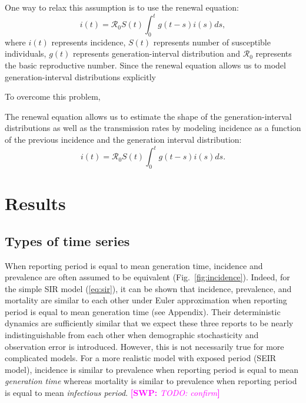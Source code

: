 \documentclass{article}
\newcommand{\eref}[1]{(\ref{eq:#1})}
\newcommand{\fref}[1]{Fig.~\ref{fig:#1}}
\newcommand{\comment}[3]{\textcolor{#1}{\textbf{[#2: }\textsl{#3}\textbf{]}}}
\newcommand{\swp}[1]{\comment{magenta}{SWP}{#1}}
\begin{document}
One way to relax this assumption is to use the renewal equation:
\begin{equation}
i(t) = \mathcal R_0 S(t) \int_0^t g(t-s) i(s) ds,
\end{equation}
where $i(t)$ represents incidence, $S(t)$ represents number of susceptible individuals, $g(t)$ represents generation-interval distribution and $\mathcal R_0$ represents the basic reproductive number.
Since the renewal equation allows us to model generation-interval distributions explicitly  

To overcome this problem, 

The renewal equation allows us to estimate the shape of the generation-interval distributions as well as the transmission rates by modeling incidence as a function of the previous incidence and the generation interval distribution:
\begin{equation}
i(t) = \mathcal R_0 S(t) \int_0^t g(t-s) i(s) ds.
\end{equation}


 \citep{li2018fitting}



\section{Results}

\subsection{Types of time series}

When reporting period is equal to mean generation time, incidence and prevalence are often assumed to be equivalent (\fref{incidence}).
Indeed, for the simple SIR model \eref{sir}, it can be shown that incidence, prevalence, and mortality are similar to each other under Euler approximation when reporting period is equal to mean generation time (see Appendix).
Their deterministic dynamics are sufficiently similar that we expect these three reports to be nearly indistinguishable from each other when demographic stochasticity and observation error is introduced.
However, this is not necessarily true for more complicated models.
For a more realistic model with exposed period (SEIR model), incidence is similar to prevalence when reporting period is equal to mean \emph{generation time} whereas mortality is similar to prevalence when reporting period is equal to mean \emph{infectious period}. \swp{TODO: confirm}
\end{document}

